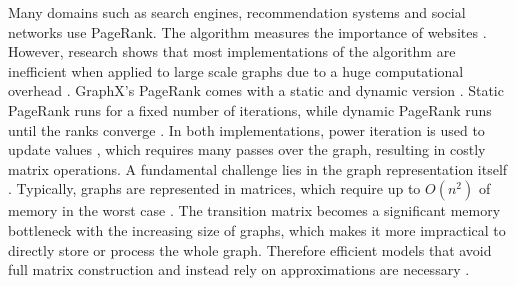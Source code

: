 \documentclass[a4paper,12pt]{article}
\begin{document}
Many domains such as search engines, recommendation systems and social networks use PageRank. The algorithm measures the importance of websites \cite{wu_efficient_2024}. However, research shows that most implementations of the algorithm are inefficient when applied to large scale graphs due to a huge computational overhead \cite{wu_efficient_2024}\cite{jayaram_dynamic_2024}\cite{yang_efficient_2024}. GraphX's PageRank comes with a static and dynamic version \cite{xin_graphx_2013}. Static PageRank runs for a fixed number of iterations, while dynamic PageRank runs until the ranks converge \cite{xin_graphx_2013}. In both implementations, power iteration is used to update values \cite{xin_graphx_2013}, which requires many passes over the graph, resulting in costly matrix operations.  A fundamental challenge lies in the graph representation itself \cite{liu_fast_2015}. Typically, graphs are represented in matrices, which require up to $O(n^2)$ of memory in the worst case \cite{wu_efficient_2024}. The transition matrix becomes a significant memory bottleneck with the increasing size of graphs, which makes it more impractical to directly store or process the whole graph. Therefore efficient models that avoid full matrix construction and instead rely on approximations are necessary \cite{liu_fast_2015}.
\end{document}
